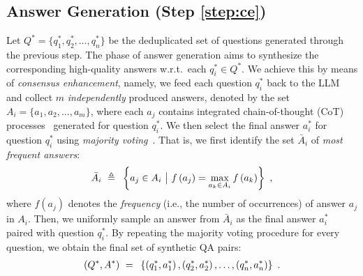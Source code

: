 \subsection{Answer Generation (Step \ref{step:ce})}
Let $Q^* = \{q_1^*, q_2^*, \ldots, q_n^*\}$ be the deduplicated set of questions generated through the previous step. The phase of answer generation aims to synthesize the corresponding high-quality answers w.r.t.\ each $q_i^* \in Q^*$. We achieve this by means of \emph{consensus enhancement}, namely, we feed each question \( q_i^* \) back to the LLM and collect \( m \) \emph{independently} produced answers, denoted by the set \( A_i = \{a_1, a_2, \ldots, a_m\} \), where each \( a_j\) contains integrated chain-of-thought (CoT) processes~\cite{DBLP:conf/nips/Wei0SBIXCLZ22} generated for question \( q_i^* \). We then select the final answer $a_i^*$ for question $q_i^*$ using 
\emph{majority voting}~\cite{DBLP:conf/iclr/0002WSLCNCZ23}.
That is, we first identify the set $\bar{A}_i$ of \emph{most frequent answers}:
\begin{align*}
    \bar{A}_i \ {}{}\triangleq{}{}\  \left\{a_j \in A_i \ \big\vert\  f\left(a_j\right) = \max_{a_k \in A_i} f\left(a_k\right)\right\}~,
\end{align*}%
where \( f(a_j) \) denotes the \emph{frequency} (i.e., the number of occurrences) of answer \( a_j \) in \( A_i \). Then, we uniformly sample an answer from $\bar{A}_i$ as the final answer $a_i^*$ paired with question \( q_i^* \). By repeating the majority voting procedure for every question, we obtain the final set of synthetic QA pairs:
\begin{align*}
    (Q^*, A^*) ~{}={}~ \left\{ \left(q_1^*,a_1^*\right), \left(q_2^*,a_2^*\right), \ldots, \left(q_n^*,a_n^*\right) \right\}~.
\end{align*}%




